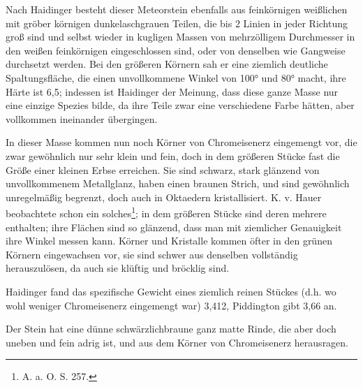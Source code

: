 \documentclass[a4paper, 11pt, oneside]{article}
\begin{document}
Nach Haidinger besteht dieser Meteorstein ebenfalls aus feinkörnigen weißlichen mit gröber körnigen dunkelaschgrauen Teilen, die bis 2 Linien in jeder Richtung groß sind und selbst wieder in kugligen Massen von mehrzölligem Durchmesser in den weißen feinkörnigen eingeschlossen sind, oder von denselben wie Gangweise durchsetzt werden. Bei den größeren Körnern sah er eine ziemlich deutliche Spaltungsfläche, die einen unvollkommene Winkel von 100° und 80° macht, ihre Härte ist 6,5; indessen ist Haidinger der Meinung, dass diese ganze Masse nur eine einzige Spezies bilde, da ihre Teile zwar eine verschiedene Farbe hätten, aber vollkommen ineinander übergingen.

In dieser Masse kommen nun noch Körner von Chromeisenerz eingemengt vor, die zwar gewöhnlich nur sehr klein und fein, doch in dem größeren Stücke fast die Größe einer kleinen Erbse erreichen. Sie sind schwarz, stark glänzend von unvollkommenem Metallglanz, haben einen braunen Strich, und sind gewöhnlich unregelmäßig begrenzt, doch auch in Oktaedern kristallisiert. K. v. Hauer beobachtete schon ein solches\footnote{A. a. O. S. 257.}; in dem größeren Stücke sind deren mehrere enthalten; ihre Flächen sind so glänzend, dass man mit ziemlicher Genauigkeit ihre Winkel messen kann. Körner und Kristalle kommen öfter in den grünen Körnern eingewachsen vor, sie sind schwer aus denselben vollständig herauszulösen, da auch sie klüftig und bröcklig sind.

Haidinger fand das spezifische Gewicht eines ziemlich reinen Stückes (d.h. wo wohl weniger Chromeisenerz eingemengt war) 3,412, Piddington gibt 3,66 an.

Der Stein hat eine dünne schwärzlichbraune ganz matte Rinde, die aber doch uneben und fein adrig ist, und aus dem Körner von Chromeisenerz herausragen.
\end{document}
